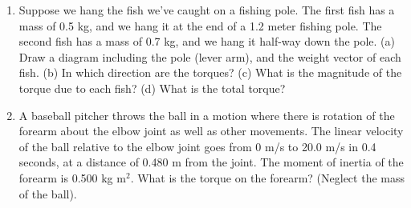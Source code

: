 \documentclass[10pt]{article}
\begin{document}
\begin{enumerate}
\item Suppose we hang the fish we've caught on a fishing pole.  The first fish has a mass of 0.5 kg, and we hang it at the end of a 1.2 meter fishing pole.  The second fish has a mass of 0.7 kg, and we hang it half-way down the pole.  (a) Draw a diagram including the pole (lever arm), and the weight vector of each fish.  (b) In which direction are the torques?  (c) What is the magnitude of the torque due to each fish?  (d) What is the total torque? \\ \vspace{3cm}
\item  A baseball pitcher throws the ball in a motion where there is rotation of the forearm about the elbow joint as well as other movements.  The linear velocity of the ball relative to the elbow joint goes from 0 m/s to 20.0 m/s in 0.4 seconds, at a distance of 0.480 m from the joint.  The moment of inertia of the forearm is 0.500 kg m$^2$.  What is the torque on the forearm?  (Neglect the mass of the ball).  \\ \vspace{2.5cm}
\end{enumerate}
\end{document}
